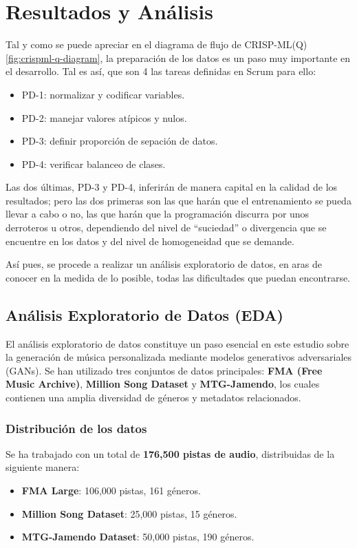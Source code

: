 \chapter{Resultados y Análisis}

Tal y como se puede apreciar en el diagrama de flujo de CRISP-ML(Q)\ref{fig:crispml-q-diagram}, la preparación de los datos es un paso muy importante en el desarrollo. Tal es así, que son 4 las tareas definidas en Scrum para ello:
\begin{itemize}
    \item PD-1: normalizar y codificar variables.
    \item PD-2: manejar valores atípicos y nulos.
    \item PD-3: definir proporción de sepación de datos.
    \item PD-4: verificar balanceo de clases.
\end{itemize}

Las dos últimas, PD-3 y PD-4, inferirán de manera capital en la calidad de los resultados; pero las dos primeras son las que harán que el entrenamiento se pueda llevar a cabo o no, las que harán que la programación discurra por unos derroteros u otros, dependiendo del nivel de ``suciedad'' o divergencia que se encuentre en los datos y del nivel de homogeneidad que se demande.

Así pues, se procede a realizar un análisis exploratorio de datos, en aras de conocer en la medida de lo posible, todas las dificultades que puedan encontrarse.

\section{Análisis Exploratorio de Datos (EDA)}

El análisis exploratorio de datos constituye un paso esencial en este estudio sobre la generación de música personalizada mediante modelos generativos adversariales (GANs). Se han utilizado tres conjuntos de datos principales: \textbf{FMA (Free Music Archive)}, \textbf{Million Song Dataset} y \textbf{MTG-Jamendo}, los cuales contienen una amplia diversidad de géneros y metadatos relacionados.

\subsection{Distribución de los datos}
Se ha trabajado con un total de \textbf{176,500 pistas de audio}, distribuidas de la siguiente manera:
\begin{itemize}
\item \textbf{FMA Large}: 106,000 pistas, 161 géneros.
\item \textbf{Million Song Dataset}: 25,000 pistas, 15 géneros.
\item \textbf{MTG-Jamendo Dataset}: 50,000 pistas, 190 géneros.
\end{itemize}

